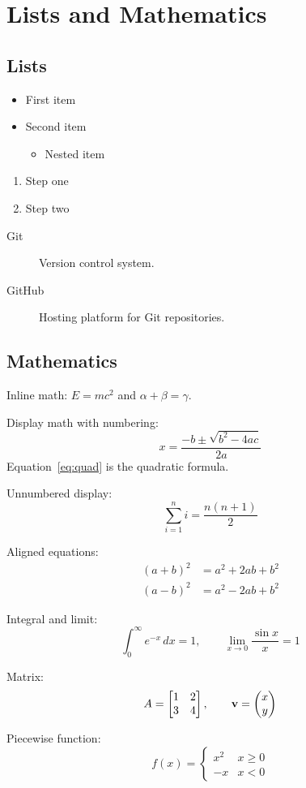 \chapter{Lists and Mathematics}

\section{Lists}
\begin{itemize}
  \item First item
  \item Second item
  \begin{itemize}
    \item Nested item
  \end{itemize}
\end{itemize}

\begin{enumerate}
  \item Step one
  \item Step two
\end{enumerate}

\begin{description}
  \item[Git] Version control system.
  \item[GitHub] Hosting platform for Git repositories.
\end{description}

\section{Mathematics}
Inline math: $E = mc^2$ and $\alpha + \beta = \gamma$.

Display math with numbering:
\begin{equation}
  x = \frac{-b \pm \sqrt{b^2 - 4ac}}{2a}
  \label{eq:quad}
\end{equation}
Equation~\ref{eq:quad} is the quadratic formula.

Unnumbered display: \[ \sum_{i=1}^{n} i = \frac{n(n+1)}{2} \]

Aligned equations:
\begin{align}
  (a+b)^2 &= a^2 + 2ab + b^2 \\
  (a-b)^2 &= a^2 - 2ab + b^2
\end{align}

Integral and limit:
\[ \int_{0}^{\infty} e^{-x}\,dx = 1, \qquad \lim_{x \to 0}\frac{\sin x}{x} = 1 \]

Matrix:
\[
A = \begin{bmatrix} 1 & 2 \\ 3 & 4 \end{bmatrix},
\qquad \mathbf{v} = \begin{pmatrix} x \\ y \end{pmatrix}
\]

Piecewise function:
\[
f(x) = \begin{cases}
  x^2 & x \ge 0 \\
  -x  & x < 0
\end{cases}
\]
